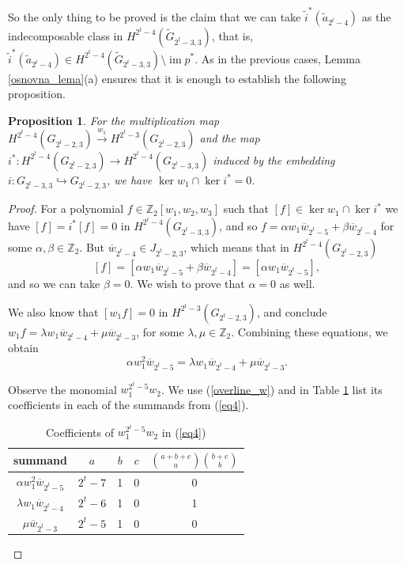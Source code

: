 \documentclass{amsart}
\newcommand{\im}{\operatorname{im}}
\newtheorem{proposition}[theorem]{Proposition}
\theoremstyle{definition}
\theoremstyle{remark}
\numberwithin{equation}{section}
\begin{document}
So the only thing to be proved is the claim that we can take $\widetilde i^*(\widetilde a_{2^t-4})$ as the indecomposable class in $H^{2^t-4}(\widetilde G_{2^t-3,3})$, that is, $\widetilde i^*(\widetilde a_{2^t-4})\in H^{2^t-4}(\widetilde G_{2^t-3,3})\setminus\im p^*$. As in the previous cases, Lemma \ref{osnovna_lema}(a) ensures that it is enough to establish the following proposition.

\begin{proposition}
     For the multiplication map $H^{2^t-4}(G_{2^t-2,3})\stackrel{w_1}\longrightarrow H^{2^t-3}(G_{2^t-2,3})$ and the map $i^*:H^{2^t-4}(G_{2^t-2,3})\rightarrow H^{2^t-4}(G_{2^t-3,3})$ induced by the embedding $i:G_{2^t-3,3}\hookrightarrow G_{2^t-2,3}$, we have
    $\ker w_1\cap \ker i^* = 0$.
\end{proposition}
\begin{proof}
    For a polynomial $f\in\mathbb Z_2[w_1,w_2,w_3]$ such that $[f]\in \ker w_1\cap \ker i^*$ we have $[f]=i^*[f]=0$ in $H^{2^t-4}(G_{2^t-3,3})$, and so $f = \alpha w_1 \overline w_{2^t-5} + \beta \overline w_{2^t-4}$ for some $\alpha,\beta\in\mathbb Z_2$. But $\overline w_{2^t-4}\in J_{2^t-2,3}$, which means that in $H^{2^t-4}(G_{2^t-2,3})$
    \[[f] = [\alpha w_1 \overline w_{2^t-5} + \beta \overline w_{2^t-4}] = [\alpha w_1 \overline w_{2^t-5}],\]
    and so we can take $\beta=0$. We wish to prove that $\alpha=0$ as well.

We also know that $[w_1f] = 0$ in $H^{2^t-3}(G_{2^t-2,3})$, and conclude $w_1f = \lambda w_1 \overline w_{2^t-4} + \mu \overline w_{2^t-3}$, for some $\lambda,\mu\in\mathbb Z_2$. Combining these equations, we obtain
\begin{equation}\label{eq4}
    \alpha w_1^2 \overline w_{2^t-5} = \lambda w_1 \overline w_{2^t-4} + \mu \overline w_{2^t-3}.
\end{equation}

Observe the monomial $w_1^{2^t-5}w_2$. We use (\ref{overline_w}) and in Table \ref{tab:4} list its coefficients in each of the summands from (\ref{eq4}).
\begin{table}[h]
\renewcommand{\arraystretch}{1.5} %
\begin{tabular}{|c|c|c|c|c|}
 \hline
 summand & $a$ & $b$ & $c$ & $\binom{a+b+c}{a}\binom{b+c}{b}$ \\ [1ex]
 \hline
$\alpha w_1^2 \overline w_{2^t-5}$ & $2^t-7$ & 1 & 0 &   0\\ 
$\lambda w_1 \overline w_{2^t-4}$ & $2^t-6$ & 1 & 0 &   1\\
$\mu \overline w_{2^t-3}$ & $2^t-5$ & 1 & 0 &   0\\
 \hline
  \end{tabular}
\caption{\label{tab:4} Coefficients of $w_1^{2^t-5}w_2$ in (\ref{eq4})}
\end{table}


\end{proof}
\end{document}
